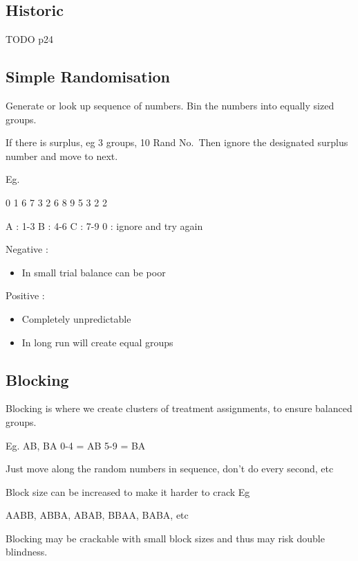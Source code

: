 \documentclass[
  letterpaper,
  DIV=11,
  numbers=noendperiod]{scrreprt}
\providecommand{\tightlist}{%
  \setlength{\itemsep}{0pt}\setlength{\parskip}{0pt}}\usepackage{longtable,booktabs,array}
\begin{document}
\hypertarget{historic}{%
\subsection{Historic}\label{historic}}

TODO p24

\hypertarget{simple-randomisation}{%
\subsection{Simple Randomisation}\label{simple-randomisation}}

Generate or look up sequence of numbers. Bin the numbers into equally
sized groups.

If there is surplus, eg 3 groups, 10 Rand No.~Then ignore the designated
surplus number and move to next.

Eg.

0 1 6 7 3 2 6 8 9 5 3 2 2

A : 1-3 B : 4-6 C : 7-9 0 : ignore and try again

Negative :

\begin{itemize}
\tightlist
\item
  In small trial balance can be poor
\end{itemize}

Positive :

\begin{itemize}
\tightlist
\item
  Completely unpredictable
\item
  In long run will create equal groups
\end{itemize}

\hypertarget{blocking}{%
\subsection{Blocking}\label{blocking}}

Blocking is where we create clusters of treatment assignments, to ensure
balanced groups.

Eg. AB, BA 0-4 = AB 5-9 = BA

Just move along the random numbers in sequence, don't do every second,
etc

Block size can be increased to make it harder to crack Eg

AABB, ABBA, ABAB, BBAA, BABA, etc

Blocking may be crackable with small block sizes and thus may risk
double blindness.
\end{document}
